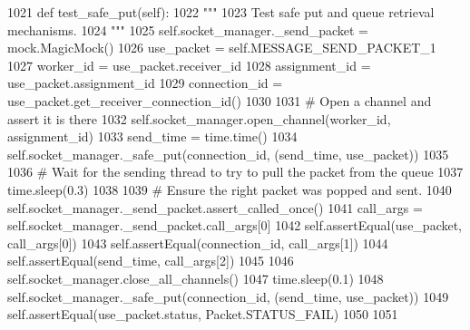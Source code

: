 \begin{DoxyCode}
1021     \textcolor{keyword}{def }test\_safe\_put(self):
1022         \textcolor{stringliteral}{"""}
1023 \textcolor{stringliteral}{        Test safe put and queue retrieval mechanisms.}
1024 \textcolor{stringliteral}{        """}
1025         self.socket\_manager.\_send\_packet = mock.MagicMock()
1026         use\_packet = self.MESSAGE\_SEND\_PACKET\_1
1027         worker\_id = use\_packet.receiver\_id
1028         assignment\_id = use\_packet.assignment\_id
1029         connection\_id = use\_packet.get\_receiver\_connection\_id()
1030 
1031         \textcolor{comment}{# Open a channel and assert it is there}
1032         self.socket\_manager.open\_channel(worker\_id, assignment\_id)
1033         send\_time = time.time()
1034         self.socket\_manager.\_safe\_put(connection\_id, (send\_time, use\_packet))
1035 
1036         \textcolor{comment}{# Wait for the sending thread to try to pull the packet from the queue}
1037         time.sleep(0.3)
1038 
1039         \textcolor{comment}{# Ensure the right packet was popped and sent.}
1040         self.socket\_manager.\_send\_packet.assert\_called\_once()
1041         call\_args = self.socket\_manager.\_send\_packet.call\_args[0]
1042         self.assertEqual(use\_packet, call\_args[0])
1043         self.assertEqual(connection\_id, call\_args[1])
1044         self.assertEqual(send\_time, call\_args[2])
1045 
1046         self.socket\_manager.close\_all\_channels()
1047         time.sleep(0.1)
1048         self.socket\_manager.\_safe\_put(connection\_id, (send\_time, use\_packet))
1049         self.assertEqual(use\_packet.status, Packet.STATUS\_FAIL)
1050 
1051 
\end{DoxyCode}
\mbox{\label{classparlai_1_1mturk_1_1core_1_1test_1_1test__socket__manager_1_1TestSocketManagerRoutingFunctionality_a96f09da0aa945b0ad1033a8c21ec6ba0}} 
